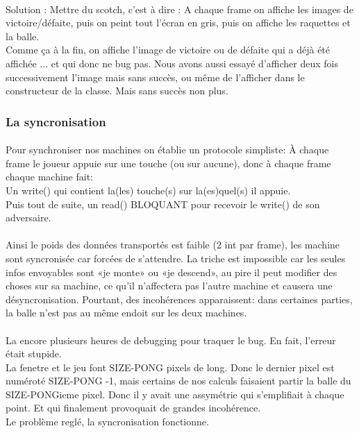 \documentclass[a4paper, 12pt]{scrreprt}
\begin{document}
\paragraph{}
Solution : Mettre du scotch, c'est à dire : A chaque frame on affiche les images de victoire/défaite, puis on peint tout l'écran en gris, puis on affiche les raquettes et la balle.\\
Comme ça à la fin, on affiche l'image de victoire ou de défaite qui a déjà été affichée ... et qui donc ne bug pas.
Nous avons aussi essayé d'afficher deux fois successivement l'image mais sans succès, ou même de l'afficher dans le constructeur de la classe. Mais sans succès non plus.
\subsubsection*{La syncronisation}
\paragraph{}
Pour synchroniser nos machines on établie un protocole simpliste:
À chaque frame le joueur appuie sur une touche (ou sur aucune), donc à chaque frame chaque machine fait:
\\Un write() qui contient la(les) touche(s) sur la(es)quel(s) il appuie.
\\Puis tout de suite, un read() BLOQUANT pour recevoir le write() de son adversaire.
\paragraph{}
Ainsi le poids des données transportés est faible (2 int par frame), les machine sont syncronisée car forcées de s'attendre. La triche est impossible car les seules infos envoyables sont «je monte» ou «je descend», au pire il peut modifier des choses sur sa machine, ce qu'il n'affectera pas l'autre machine et causera une désyncronisation.
Pourtant, des incohérences apparaissent: dans certaines parties, la balle n'est pas au même endoit sur les deux machines.
\paragraph{}
La encore plusieurs heures de debugging pour traquer le bug. En fait, l'erreur était stupide.
\\La fenetre et le jeu font SIZE-PONG pixels de long. Donc le dernier pixel est numéroté SIZE-PONG -1, mais certains de nos calculs faisaient partir la balle du SIZE-PONGieme pixel. Donc il y avait une assymétrie qui s'emplifiait à chaque point. Et qui finalement provoquait de grandes incohérence.
\\Le problème reglé, la syncronisation fonctionne.
\end{document}

